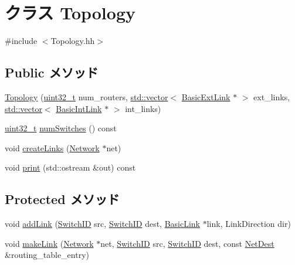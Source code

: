 \hypertarget{classTopology}{
\section{クラス Topology}
\label{classTopology}
}


{\ttfamily \#include $<$Topology.hh$>$}\subsection*{Public メソッド}
\begin{DoxyCompactItemize}
\item 
\hyperlink{classTopology_a0153481ba5c73c2eb2e5267f3dc9ac89}{Topology} (\hyperlink{Type_8hh_a435d1572bf3f880d55459d9805097f62}{uint32\_\-t} num\_\-routers, \hyperlink{classstd_1_1vector}{std::vector}$<$ \hyperlink{classBasicExtLink}{BasicExtLink} $\ast$ $>$ ext\_\-links, \hyperlink{classstd_1_1vector}{std::vector}$<$ \hyperlink{classBasicIntLink}{BasicIntLink} $\ast$ $>$ int\_\-links)
\item 
\hyperlink{Type_8hh_a435d1572bf3f880d55459d9805097f62}{uint32\_\-t} \hyperlink{classTopology_a2a6b2aa79e812a5e4168dc5a670891c0}{numSwitches} () const 
\item 
void \hyperlink{classTopology_a6d36a345f1cb410128c9fb5c653e17b1}{createLinks} (\hyperlink{classNetwork}{Network} $\ast$net)
\item 
void \hyperlink{classTopology_ac55fe386a101fbae38c716067c9966a0}{print} (std::ostream \&out) const 
\end{DoxyCompactItemize}
\subsection*{Protected メソッド}
\begin{DoxyCompactItemize}
\item 
void \hyperlink{classTopology_a259a2ab68e1f0dd5b79daa26031862f2}{addLink} (\hyperlink{TypeDefines_8hh_ac925a332c83eaf1e40e056e7a20ebcd8}{SwitchID} src, \hyperlink{TypeDefines_8hh_ac925a332c83eaf1e40e056e7a20ebcd8}{SwitchID} dest, \hyperlink{classBasicLink}{BasicLink} $\ast$link, LinkDirection dir)
\item 
void \hyperlink{classTopology_a00d2816a2478d6f300159f8cefe12354}{makeLink} (\hyperlink{classNetwork}{Network} $\ast$net, \hyperlink{TypeDefines_8hh_ac925a332c83eaf1e40e056e7a20ebcd8}{SwitchID} src, \hyperlink{TypeDefines_8hh_ac925a332c83eaf1e40e056e7a20ebcd8}{SwitchID} dest, const \hyperlink{classNetDest}{NetDest} \&routing\_\-table\_\-entry)
\end{DoxyCompactItemize}
